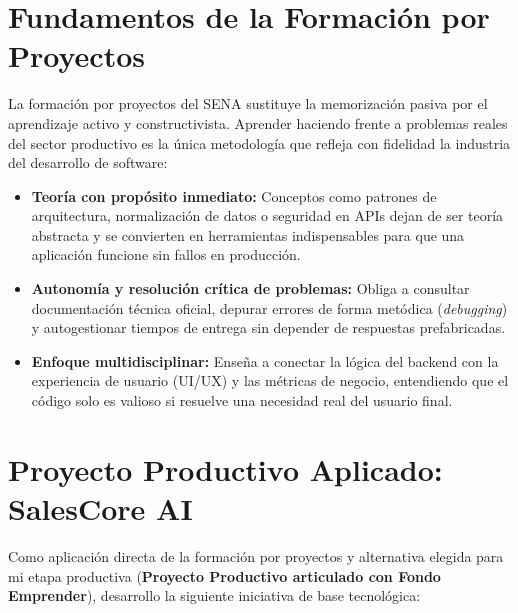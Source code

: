 \documentclass[12pt,letterpaper]{article}
\begin{document}
\section{Fundamentos de la Formación por Proyectos}

La formación por proyectos del SENA sustituye la memorización pasiva por el aprendizaje activo y constructivista. Aprender haciendo frente a problemas reales del sector productivo es la única metodología que refleja con fidelidad la industria del desarrollo de software:

\begin{itemize}
    \item \textbf{Teoría con propósito inmediato:} Conceptos como patrones de arquitectura, normalización de datos o seguridad en APIs dejan de ser teoría abstracta y se convierten en herramientas indispensables para que una aplicación funcione sin fallos en producción.
    \item \textbf{Autonomía y resolución crítica de problemas:} Obliga a consultar documentación técnica oficial, depurar errores de forma metódica (\textit{debugging}) y autogestionar tiempos de entrega sin depender de respuestas prefabricadas.
    \item \textbf{Enfoque multidisciplinar:} Enseña a conectar la lógica del backend con la experiencia de usuario (UI/UX) y las métricas de negocio, entendiendo que el código solo es valioso si resuelve una necesidad real del usuario final.
\end{itemize}

\section{Proyecto Productivo Aplicado: SalesCore AI}

Como aplicación directa de la formación por proyectos y alternativa elegida para mi etapa productiva (\textbf{Proyecto Productivo articulado con Fondo Emprender}), desarrollo la siguiente iniciativa de base tecnológica:
\end{document}
